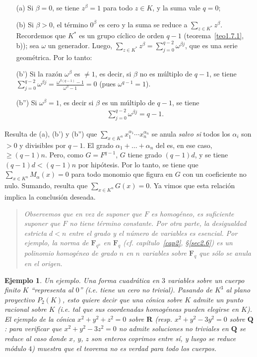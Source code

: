 \documentclass[bibtotoc,leqno,spanish]{amsbook}
\newcommand{\RR}{\mathbf{R}}
\newcommand{\QQ}{\mathbf{Q}}
\newcommand{\FF}{\mathbf{F}}
\numberwithin{equation}{section}
\newenvironment{comm}%
	{\begin{quotation}\itshape\Small}
	{\end{quotation}}
\theoremstyle{note}
\theoremstyle{note}
\theoremstyle{rem}
\newtheorem*{example*}{Ejemplo}
\numberwithin{theorem}{section}
\numberwithin{proposition}{section}
\numberwithin{definition}{section}
\numberwithin{lemma}{section}
\numberwithin{corollary}{section}
\numberwithin{example}{section}
\numberwithin{footnote}{section}%
\begin{document}
\begin{enumerate}
\item[(a)] Si $\beta = 0$, se tiene $z^{\beta} =1$ para todo $z\in K$, y la suma vale $q = 0$;

\item[(b)] Si $\beta > 0$, el t\'ermino $0^{\beta}$ es cero y la suma se reduce a $\sum_{z\in K^{*}}z^{\beta}$. Recordemos
que $K^{*}$ es un grupo c\'iclico de orden $q-1$ (teorema~\ref{teo1.7.1}, b));
sea $\omega$ un generador. Luego,
$\sum_{z\in K^{*}}z^{\beta} = \sum_{j=0}^{q-2}\omega^{\beta j}$, que es una serie geom\'etrica. Por lo tanto:

\item[(b')] Si la raz\'on $\omega^{\beta}$ es $\neq 1$, es decir, si $\beta$ no es m\'ultiplo de $q-1$, se tiene
$\sum_{j=0}^{q-2}\omega^{\beta j} = \frac{\omega^{\beta(q-1)}-1}{\omega^{\beta}-1} = 0$ (pues $\omega^{q-1} = 1$).

\item[(b'')] Si $\omega^{\beta} = 1$, es decir si $\beta$ es un m\'ultiplo de $q-1$, se tiene
\begin{gather*}
\sum_{j=0}^{q-2}\omega^{\beta j} = q-1.
\end{gather*}
\end{enumerate}
Resulta de (a), (b') y (b'') que $\sum_{x\in K^{n}}x_{1}^{\alpha_{1}}\cdots x_{n}^{\alpha_{n}}$ se anula {\em salvo
si} todos los $\alpha_{i}$ son $>0$ y divisibles por $q-1$. El grado $\alpha_{1}+\dots+\alpha_{n}$ del
es, en ese caso, $\geq (q-1)n$. Pero, como $G = F^{q-1}$, $G$ tiene grado $(q-1)d$, y se tiene
$(q-1)d < (q-1)n$ por hip\'otesis. Por lo tanto, se tiene que $\sum_{x\in K^{n}}M_{\alpha}(x) = 0$ para todo
monomio que figura en $G$ con un coeficiente no nulo. Sumando, resulta que $\sum_{x\in K^{n}}G(x) = 0$. Ya vimos
que esta relaci\'on implica la conclusi\'on deseada.

\begin{comm}
Observemos que en vez de suponer que $F$ es homog\'eneo, es suficiente suponer que $F$ no tiene t\'ermino constante.
Por otra parte, la desigualdad {\em estricta} $d < n$ entre el grado y el n\'umero de variables es esencial.
Por ejemplo, la {\em norma} de $\FF_{q^{n}}$ en $\FF_{q}$ (cf. cap\'itulo~\ref{cap2}, \S\ref{sec2.6}) es un polinomio
homog\'eneo de grado $n$ en $n$ variables sobre $\FF_{q}$ que s\'olo se anula en el origen.
\end{comm}

\begin{example*}
{\itshape Un ejemplo.} Una forma cuadr\'atica en $3$ variables sobre un cuerpo {\em finito} $K$
``representa al $0$'' (i.e. tiene un cero no trivial). Pasando de $K^{3}$ al plano proyectivo
$P_{2}(K)$, esto quiere decir que una {\em c\'onica} sobre $K$ admite un punto racional sobre $K$
(i.e. tal que sus coordenadas homog\'eneas pueden elegirse en $K$). El ejemplo de la c\'onica
$x^{2}+y^{2}+z^{2}=0$ sobre $\RR$ (resp. $x^{2}+y^{2}-3y^{2}=0$ sobre $\QQ$: para verificar que
$x^{2}+y^{2}-3z^{2}=0$ no admite soluciones no triviales en $\QQ$ se reduce al caso donde $x$, $y$, $z$
son enteros coprimos entre s\'i, y luego se reduce m\'odulo $4$) muestra que el teorema no es verdad para
todo los cuerpos.
\end{example*}
\end{document}
